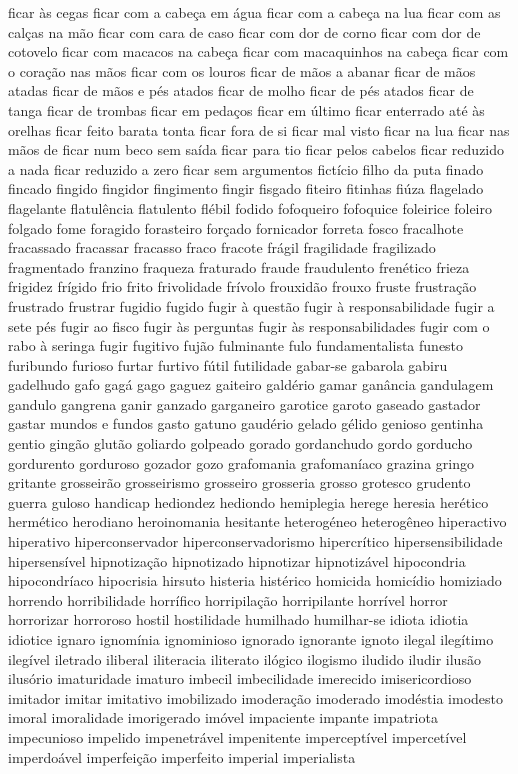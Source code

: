 ficar \`{a}s cegas ficar com a cabe\c{c}a em \'{a}gua ficar com a cabe\c{c}a na lua ficar com as cal\c{c}as na m\~ao ficar com cara de caso ficar com dor de corno ficar com dor de cotovelo ficar com macacos na cabe\c{c}a ficar com macaquinhos na cabe\c{c}a ficar com o cora\c{c}\~ao nas m\~aos ficar com os louros ficar de m\~aos a abanar ficar de m\~aos atadas ficar de m\~aos e p\'{e}s atados ficar de molho ficar de p\'{e}s atados ficar de tanga ficar de trombas ficar em peda\c{c}os ficar em \'{u}ltimo ficar enterrado at\'{e} \`{a}s orelhas ficar feito barata tonta ficar fora de si ficar mal visto ficar na lua ficar nas m\~aos de ficar num beco sem sa\'{i}da ficar para tio ficar pelos cabelos ficar reduzido a nada ficar reduzido a zero ficar sem argumentos fict\'{i}cio filho da puta finado fincado fingido fingidor fingimento fingir fisgado fiteiro fitinhas fi\'{u}za flagelado flagelante flatul\^{e}ncia flatulento fl\'{e}bil fodido fofoqueiro fofoquice foleirice foleiro folgado fome foragido forasteiro for\c{c}ado fornicador forreta fosco fracalhote fracassado fracassar fracasso fraco fracote fr\'{a}gil fragilidade fragilizado fragmentado franzino fraqueza fraturado fraude fraudulento fren\'{e}tico frieza frigidez fr\'{i}gido frio frito frivolidade fr\'{i}volo frouxid\~ao frouxo fruste frustra\c{c}\~ao frustrado frustrar fugidio fugido fugir \`{a} quest\~ao fugir \`{a} responsabilidade fugir a sete p\'{e}s fugir ao fisco fugir \`{a}s perguntas fugir \`{a}s responsabilidades fugir com o rabo \`{a} seringa fugir fugitivo fuj\~ao fulminante fulo fundamentalista funesto furibundo furioso furtar furtivo f\'{u}til futilidade gabar-se gabarola gabiru gadelhudo gafo gag\'{a} gago gaguez gaiteiro gald\'{e}rio gamar gan\^{a}ncia gandulagem gandulo gangrena ganir ganzado garganeiro garotice garoto gaseado gastador gastar mundos e fundos gasto gatuno gaud\'{e}rio gelado g\'{e}lido genioso gentinha gentio ging\~ao glut\~ao goliardo golpeado gorado gordanchudo gordo gorducho gordurento gorduroso gozador gozo grafomania grafoman\'{i}aco grazina gringo gritante grosseir\~ao grosseirismo grosseiro grosseria grosso grotesco grudento guerra guloso handicap hediondez hediondo hemiplegia herege heresia her\'{e}tico herm\'{e}tico herodiano heroinomania hesitante heterog\'{e}neo heterog\^{e}neo hiperactivo hiperativo hiperconservador hiperconservadorismo hipercr\'{i}tico hipersensibilidade hipersens\'{i}vel hipnotiza\c{c}\~ao hipnotizado hipnotizar hipnotiz\'{a}vel hipocondria hipocondr\'{i}aco hipocrisia hirsuto histeria hist\'{e}rico homicida homic\'{i}dio homiziado horrendo horribilidade horr\'{i}fico horripila\c{c}\~ao horripilante horr\'{i}vel horror horrorizar horroroso hostil hostilidade humilhado humilhar-se idiota idiotia idiotice ignaro ignom\'{i}nia ignominioso ignorado ignorante ignoto ilegal ileg\'{i}timo ileg\'{i}vel iletrado iliberal iliteracia iliterato il\'{o}gico ilogismo iludido iludir ilus\~ao ilus\'{o}rio imaturidade imaturo imbecil imbecilidade imerecido imisericordioso imitador imitar imitativo imobilizado imodera\c{c}\~ao imoderado imod\'{e}stia imodesto imoral imoralidade imorigerado im\'{o}vel impaciente impante impatriota impecunioso impelido impenetr\'{a}vel impenitente impercept\'{i}vel impercet\'{i}vel imperdo\'{a}vel imperfei\c{c}\~ao imperfeito imperial imperialista 